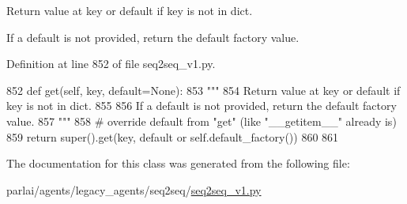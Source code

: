 \begin{DoxyVerb}Return value at key or default if key is not in dict.

If a default is not provided, return the default factory value.
\end{DoxyVerb}
 

Definition at line 852 of file seq2seq\+\_\+v1.\+py.


\begin{DoxyCode}
852     \textcolor{keyword}{def }get(self, key, default=None):
853         \textcolor{stringliteral}{"""}
854 \textcolor{stringliteral}{        Return value at key or default if key is not in dict.}
855 \textcolor{stringliteral}{}
856 \textcolor{stringliteral}{        If a default is not provided, return the default factory value.}
857 \textcolor{stringliteral}{        """}
858         \textcolor{comment}{# override default from "get" (like "\_\_getitem\_\_" already is)}
859         \textcolor{keywordflow}{return} super().get(key, default \textcolor{keywordflow}{or} self.default\_factory())
860 
861 
\end{DoxyCode}


The documentation for this class was generated from the following file\+:\begin{DoxyCompactItemize}
\item 
parlai/agents/legacy\+\_\+agents/seq2seq/\hyperlink{seq2seq__v1_8py}{seq2seq\+\_\+v1.\+py}\end{DoxyCompactItemize}
